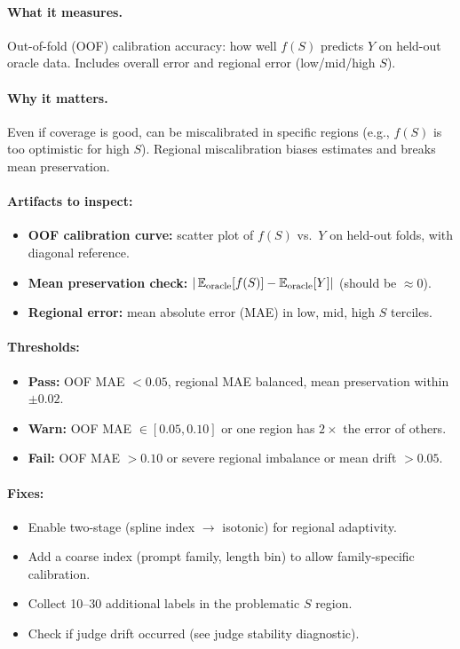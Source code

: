 \paragraph{What it measures.} Out-of-fold (OOF) calibration accuracy: how well $f(S)$ predicts $Y$ on held-out oracle data. Includes overall error and regional error (low/mid/high $S$).

\paragraph{Why it matters.} Even if coverage is good, \autocal{} can be miscalibrated in specific regions (e.g., $f(S)$ is too optimistic for high $S$). Regional miscalibration biases estimates and breaks mean preservation.

\paragraph{Artifacts to inspect:}
\begin{itemize}
\item \textbf{OOF calibration curve:} scatter plot of $f(S)$ vs.\ $Y$ on held-out folds, with diagonal reference.
\item \textbf{Mean preservation check:} $|\operatorname{\mathbb{E}}_{\text{oracle}}[f(S)] - \operatorname{\mathbb{E}}_{\text{oracle}}[Y]|$ (should be $\approx 0$).
\item \textbf{Regional error:} mean absolute error (MAE) in low, mid, high $S$ terciles.
\end{itemize}

\paragraph{Thresholds:}
\begin{itemize}
\item \textbf{Pass:} OOF MAE $< 0.05$, regional MAE balanced, mean preservation within $\pm 0.02$.
\item \textbf{Warn:} OOF MAE $\in [0.05, 0.10]$ or one region has $2\times$ the error of others.
\item \textbf{Fail:} OOF MAE $> 0.10$ or severe regional imbalance or mean drift $> 0.05$.
\end{itemize}

\paragraph{Fixes:}
\begin{itemize}
\item Enable two-stage \autocal{} (spline index $\to$ isotonic) for regional adaptivity.
\item Add a coarse index (prompt family, length bin) to allow family-specific calibration.
\item Collect 10--30 additional labels in the problematic $S$ region.
\item Check if judge drift occurred (see judge stability diagnostic).
\end{itemize}

